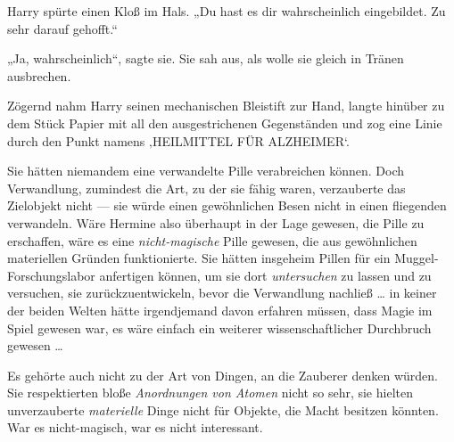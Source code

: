 Harry spürte einen Kloß im Hals.
„Du hast es dir wahrscheinlich eingebildet. Zu sehr darauf gehofft.“

„Ja, wahrscheinlich“, sagte sie. Sie sah aus, als wolle sie gleich in Tränen ausbrechen.

Zögernd nahm Harry seinen mechanischen Bleistift zur Hand, langte hinüber zu dem Stück Papier mit all den ausgestrichenen Gegenständen und zog eine Linie durch den Punkt namens ‚HEILMITTEL FÜR ALZHEIMER‘.

Sie hätten niemandem eine verwandelte Pille verabreichen können. Doch Verwandlung, zumindest die Art, zu der sie fähig waren, verzauberte das Zielobjekt nicht — sie würde einen gewöhnlichen Besen nicht in einen fliegenden verwandeln. Wäre Hermine also überhaupt in der Lage gewesen, die Pille zu erschaffen, wäre es eine \emph{nicht-magische} Pille gewesen, die aus gewöhnlichen materiellen Gründen funktionierte. Sie hätten insgeheim Pillen für ein Muggel-Forschungslabor anfertigen können, um sie dort \emph{untersuchen} zu lassen und zu versuchen, sie zurückzuentwickeln, bevor die Verwandlung nachließ … in keiner der beiden Welten hätte irgendjemand davon erfahren müssen, dass Magie im Spiel gewesen war, es wäre einfach ein weiterer wissenschaftlicher Durchbruch gewesen …

Es gehörte auch nicht zu der Art von Dingen, an die Zauberer denken würden. Sie respektierten bloße \emph{Anordnungen von Atomen} nicht so sehr, sie hielten unverzauberte \emph{materielle} Dinge nicht für Objekte, die Macht besitzen könnten. War es nicht-magisch, war es nicht interessant.

